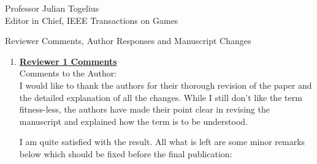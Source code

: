 \documentclass[10pt]{letter} %
\begin{document}
\begin{letter}{Professor Julian Togelius \\ Editor in Chief, IEEE Transactions on Games}
\newpage

Reviewer Comments, Author Responses and Manuscript Changes
\begin{enumerate}


\item {\bf \underline{ Reviewer 1 Comments}}\\
		Comments to the Author:\\
		I would like to thank the authors for their thorough revision of the paper and the detailed explanation of all the changes. While I still don't like the term fitness-less, the authors have made their point clear in revising the manuscript and explained how the term is to be understood.

		I am quite satisfied with the result. All what is left are some minor remarks below which should be fixed before the final publication:
		

\end{enumerate}
\end{letter}
\end{document}
